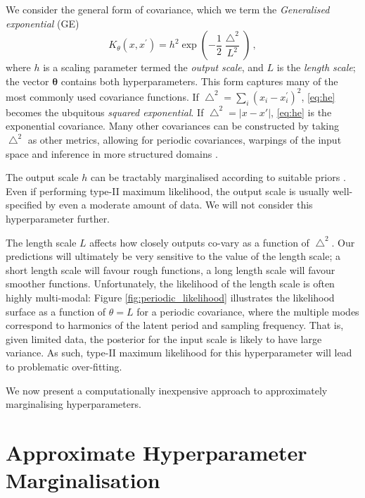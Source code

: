 \documentclass{article}
\begin{document}
We consider the general form of covariance, which we term the {\it Generalised exponential} (GE)
\begin{equation}\label{eq:he} 
K_\theta(x,x^\prime) = h^2 \exp \left( -\frac{1}{2} \frac{\bigtriangleup^2}{L^2} \right)\,,
\end{equation} 
where $h$ is a scaling parameter termed the \emph{output scale}, and $L$ is the \emph{length scale}; the vector  $\bm{\theta}$ contains both hyperparameters. This form captures many of the most commonly used covariance functions. If $\bigtriangleup^2 = \sum_i (x_i - x_i^\prime)^2$, \eqref{eq:he} becomes the ubquitous  \emph{squared exponential}. If $\bigtriangleup^2 = |x-x'|$,  \eqref{eq:he} is the exponential covariance. Many other covariances can be constructed by taking $\bigtriangleup^2$ as other metrics, allowing for periodic covariances, warpings of the input space \citep{snelson2004warped} and inference in more structured domains \citep{garnett2010bayesian}.
 
The output scale $h$ can be tractably marginalised according to suitable priors \citep{kennedy1998bayesian}. Even if performing type-II maximum likelihood, the output scale is usually well-specified by even a moderate amount of data. We will not consider this hyperparameter further. 
 
The length scale $L$ affects how closely outputs co-vary as a function of $\bigtriangleup^2$. Our predictions will ultimately be very sensitive to the value of the length scale; a short length scale will favour rough functions, a long length scale will favour smoother functions. Unfortunately, the likelihood of the length scale is often highly multi-modal: Figure \ref{fig:periodic_likelihood} illustrates the likelihood surface as a function of $\theta = L$ for a periodic covariance, where the multiple modes correspond to harmonics of the latent period and sampling frequency. That is, given limited data, the posterior for the input scale is likely to have large variance. As such, type-II maximum likelihood for this hyperparameter will lead to problematic over-fitting. 

 We now present a computationally inexpensive approach to approximately marginalising hyperparameters.

\section{Approximate Hyperparameter Marginalisation}
\end{document}
